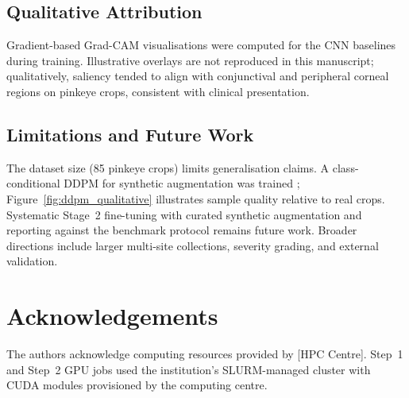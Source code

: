 \documentclass[10pt,journal,compsoc]{IEEEtran}
\begin{document}
\subsection{Qualitative Attribution}
Gradient-based Grad-CAM visualisations \cite{selvaraju2017gradcam} were
computed for the CNN baselines during training. Illustrative overlays are
not reproduced in this manuscript; qualitatively, saliency tended to align
with conjunctival and peripheral corneal regions on pinkeye crops, consistent
with clinical presentation.

\subsection{Limitations and Future Work}
The dataset size (85 pinkeye crops) limits generalisation claims. A
class-conditional DDPM for synthetic augmentation was trained
\cite{ho2020ddpm}; Figure~\ref{fig:ddpm_qualitative} illustrates sample
quality relative to real crops. Systematic Stage~2 fine-tuning with
curated synthetic augmentation and reporting against the benchmark protocol
remains future work. Broader directions include larger multi-site
collections, severity grading, and external validation.

\section*{Acknowledgements}
The authors acknowledge computing resources provided by [HPC Centre].
Step~1 and Step~2 GPU jobs used the institution's SLURM-managed cluster with
CUDA modules provisioned by the computing centre.
\end{document}
